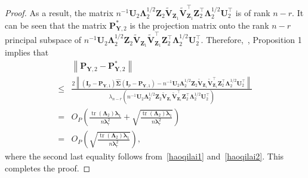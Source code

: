 \documentclass[12pt]{article} %
\DeclareMathOperator{\mytr}{tr}
\newcommand{\bZ}{\mathbf{Z}}
\newcommand{\bP}{\mathbf{P}}
\newcommand{\bY}{\mathbf{Y}}
\newcommand{\bI}{\mathbf{I}}
\newcommand{\bU}{\mathbf{U}}
\newcommand{\bV}{\mathbf{V}}
\newcommand{\bfsym}[1]{\ensuremath{\boldsymbol{#1}}}
\def\blambda {\bfsym {\lambda}}
\def\bLambda {\bfsym {\Lambda}}
\def\bSigma {\bfsym {\Sigma}}
\theoremstyle{definition}
\begin{document}
\begin{appendices}
\begin{proof}
    As a result, the matrix $n^{-1}\bU_2 \bLambda_2^{1/2} \bZ_2 \tilde{\bV}_{\bZ_1}\tilde{\bV}_{\bZ_1}^\top  \bZ_2^\top \bLambda_2^{1/2} \bU_2^\top$ is of rank $n-r$.
    It can be seen that the matrix $
    \bP_{\bY,2}^*
            $ is the projection matrix onto the rank $n-r$ principal subspace of $n^{-1}\bU_2 \bLambda_2^{1/2} \bZ_2 \tilde{\bV}_{\bZ_1}\tilde{\bV}_{\bZ_1}^\top  \bZ_2^\top \bLambda_2^{1/2} \bU_2^\top$.
            Therefore,~\cite{Cai2015Optimal}, Proposition 1 implies that
    \begin{equation*}
        \begin{split}
            &\left\|\bP_{\bY,2}-
            \bP_{\bY,2}^*
            \right\|
            \\
             \leq&
             \frac{
                 2\left\|(\bI_p -\bP_{\bY,1})\hat{\bSigma}(\bI_p -\bP_{\bY,1})
             -
         n^{-1}\bU_2 \bLambda_2^{1/2} \bZ_2 \tilde{\bV}_{\bZ_1}\tilde{\bV}_{\bZ_1}^\top  \bZ_2^\top \bLambda_2^{1/2} \bU_2^\top
             \right\|
         }{
        \lambda_{n-r}\left(
            n^{-1}\bU_2 \bLambda_2^{1/2} \bZ_2 \tilde{\bV}_{\bZ_1}\tilde{\bV}_{\bZ_1}^\top  \bZ_2^\top \bLambda_2^{1/2} \bU_2^\top
        \right)
    }
    \\
    = &
    O_P\left(
        \frac{\mytr(\bLambda_2) \blambda_1}{n\blambda_r^2}
        +
        \sqrt{\frac{\mytr(\bLambda_2) \blambda_1}{n\blambda_r^2}}
    \right)
    \\
    = &
    O_P\left(
        \sqrt{\frac{\mytr(\bLambda_2) \blambda_1}{n\blambda_r^2}}
    \right)
    ,
        \end{split}
    \end{equation*}
    where the second last equality follows from~\eqref{haoqilai1} and~\eqref{haoqilai2}.
    This completes the proof.
\end{proof}



\end{appendices}
\end{document}
